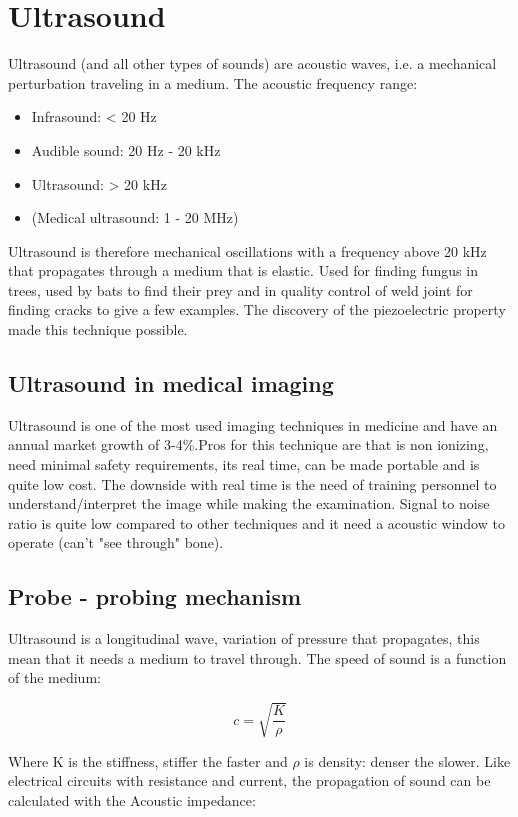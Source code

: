 \section{Ultrasound}
Ultrasound (and all other types of sounds) are acoustic waves, i.e. a mechanical perturbation traveling in a medium. The acoustic frequency range:

\begin{itemize}
	\item Infrasound: < 20 Hz
	\item Audible sound: 20 Hz - 20 kHz
	\item Ultrasound: > 20 kHz 
	\item (Medical ultrasound: 1 - 20 MHz) 
\end{itemize}

Ultrasound is therefore mechanical oscillations with a frequency above 20 kHz that propagates through a medium that is elastic. Used for finding fungus in trees, used by bats to find their prey and in quality control of weld joint for finding cracks to give a few examples. The discovery of the piezoelectric property made this technique possible. 

	\subsection*{Ultrasound in medical imaging}
	Ultrasound is one of the most used imaging techniques in medicine and have an annual market growth of 3-4\%.Pros for this technique are that is non ionizing, need minimal safety requirements, its real time, can be made portable and is quite low cost. The downside with real time is the need of training personnel to understand/interpret the image while making the examination. Signal to noise ratio is quite low compared to other techniques and it need a acoustic window to operate (can't "see through" bone). 

	\subsection*{Probe - probing mechanism}
	Ultrasound is a longitudinal wave, variation of pressure that propagates, this mean that it needs a medium to travel through. The speed of sound is a function of the medium:

		\begin{equation}
			c = \sqrt{\frac{K} {\rho} }		
		\end{equation}

	Where K is the stiffness, stiffer the faster and $\rho$ is density: denser the slower. Like electrical circuits with resistance and current, the propagation of sound can be calculated with the Acoustic impedance:

